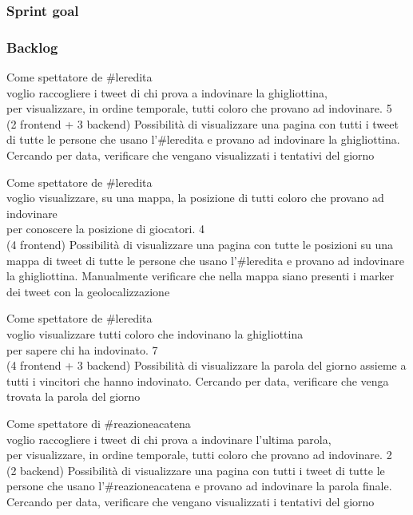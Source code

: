 \subsubsection{Sprint goal}

\subsubsection{Backlog}
\userstory%
{Come spettatore de \#leredita\\voglio raccogliere i tweet di chi prova a indovinare la ghigliottina,\\per visualizzare, in ordine temporale, tutti coloro che provano ad indovinare.}%
{5\\(2 frontend + 3 backend)}%
{Possibilità di visualizzare una pagina con tutti i tweet di tutte le persone che usano l'\#leredita e provano ad indovinare la ghigliottina.}%
{Cercando per data, verificare che vengano visualizzati i tentativi del giorno}

\userstory%
{Come spettatore de \#leredita\\voglio visualizzare, su una mappa, la posizione di tutti coloro che provano ad indovinare\\per conoscere la posizione di giocatori.}%
{4\\(4 frontend)}%
{Possibilità di visualizzare una pagina con tutte le posizioni su una mappa di tweet di tutte le persone che usano l'\#leredita e provano ad indovinare la ghigliottina.}%
{Manualmente verificare che nella mappa siano presenti i marker dei tweet con la geolocalizzazione}

\userstory%
{Come spettatore de \#leredita\\voglio visualizzare tutti coloro che indovinano la ghigliottina\\per sapere chi ha indovinato.}%
{7\\(4 frontend + 3 backend)}%
{Possibilità di visualizzare la parola del giorno assieme a tutti i vincitori che hanno indovinato.}%
{Cercando per data, verificare che venga trovata la parola del giorno}

\userstory%
{Come spettatore di \#reazioneacatena\\voglio raccogliere i tweet di chi prova a indovinare l'ultima parola,\\per visualizzare, in ordine temporale, tutti coloro che provano ad indovinare.}%
{2\\(2 backend)}%
{Possibilità di visualizzare una pagina con tutti i tweet di tutte le persone che usano l'\#reazioneacatena e provano ad indovinare la parola finale.}%
{Cercando per data, verificare che vengano visualizzati i tentativi del giorno}

